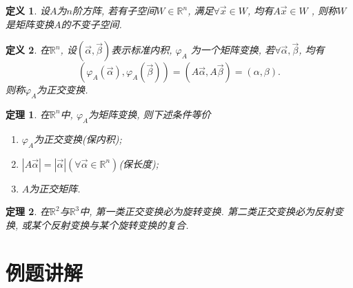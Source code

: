 \documentclass[a4paper]{book}
\newtheorem{Def}{定义}[chapter]
\newtheorem{thm}{定理}[chapter]
\begin{document}
\begin{Def}
设$A$为$n$阶方阵, 若有子空间$W\in\mathbb{R}^n$, 满足$\forall \vec{x}\in W$, 均有$A\vec{x}\in W$ , 则称$W$ 是矩阵变换$A$的不变子空间.
\end{Def}

\begin{Def}
在$\mathbb{R}^n$, 设$(\vec{\alpha},\vec{\beta})$表示标准内积, $\varphi_A$ 为一个矩阵变换, 若$\forall \vec{\alpha},\vec{\beta}$, 均有
$$(\varphi_A(\vec{\alpha}),\varphi_A(\vec{\beta}))=(A\vec{\alpha}  ,A\vec{\beta})=(\alpha,\beta).$$
则称$\varphi_A$为正交变换.
\end{Def}

\begin{thm}
在$\mathbb{R}^n$中, $\varphi_A$为矩阵变换, 则下述条件等价
\begin{enumerate}
\item $\varphi_A$为正交变换(保内积);
\item $|A\vec{\alpha}|=|\vec{\alpha}|(\forall \vec{\alpha}\in \mathbb{R}^n)$(保长度);
\item $A$为正交矩阵.
\end{enumerate}
\end{thm}

\begin{thm}
在$\mathbb{R}^2$与$\mathbb{R}^3$中, 第一类正交变换必为旋转变换. 第二类正交变换必为反射变换, 或某个反射变换与某个旋转变换的复合.
\end{thm}


\section{例题讲解}
\end{document}
